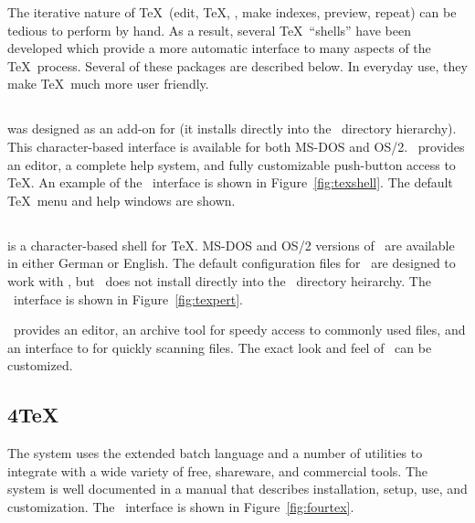 The iterative nature of \TeX\ (edit, \TeX, \BibTeX, make indexes, preview,
repeat) can be tedious to perform by hand.  As a result, several \TeX\
``shells'' have been 
developed which provide a more automatic interface
to many aspects of the \TeX\ process.  Several of these packages are
described below.  In everyday use, they make \TeX\ much more user
friendly.

\subsection{\protect\TeXShell}

 was designed as an add-on for  (it 
installs directly
into the \emTeX\ directory hierarchy).  This character-based interface
is available for both MS-DOS and OS/2. \TeXShell\ provides an editor, 
a complete help system, and fully
customizable push-button access to \TeX. An
example of the \TeXShell\ interface is shown in
Figure~\ref{fig:texshell}.  The default \TeX\ menu and help windows
are shown.


\subsection{\protect\TeXPert}

 is a character-based 
shell for \TeX.  MS-DOS and OS/2 versions of
\TeXPert\ are available in either German or English.  The default 
configuration files for \TeXPert\ are designed to work with \emTeX, but 
\TeXPert\ does not install directly into the \emTeX\ directory heirarchy.
The \TeXPert\ interface is shown in Figure~\ref{fig:texpert}.


\TeXPert\ provides an editor, an archive tool for speedy access to commonly
used files, and an interface to \program{grep} for quickly scanning files.
The exact look and feel of \TeXPert\ can be customized.

\subsection{4\protect\TeX}

The  system uses the
 extended batch language and a number of utilities
to integrate \ixx{\emTeX}{emTeX@\emTeX} with a wide variety of free,
shareware, and commercial tools.  The system is well documented in a manual
that describes installation, setup, use, and customization.
The \fourTeX\ interface is shown in Figure~\ref{fig:fourtex}.

